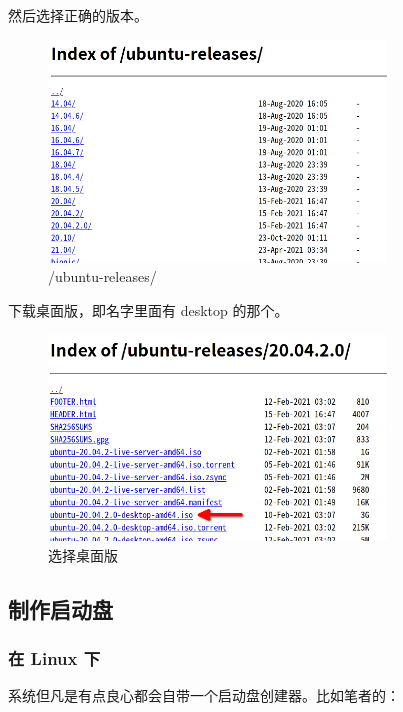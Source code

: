 \documentclass[UTF-8]{ctexart}
\begin{document}
				然后选择正确的版本。
				
				\begin{figure}[H]
					\centering
					\includegraphics[width=0.8\textwidth]{fig/mirrors163com_in_ubuntu-releases.png}
					\caption*{/ubuntu-releases/}
				\end{figure}
			
				下载桌面版，即名字里面有 desktop 的那个。
				
				\begin{figure}[H]
					\centering
					\includegraphics[width=0.8\textwidth]{fig/mirrors163com_choose_ubuntu-releases.png}
					\caption*{选择桌面版}
				\end{figure}
			
		\subsection{制作启动盘}
		
			\subsubsection{在 Linux 下}
			
				系统但凡是有点良心都会自带一个启动盘创建器。比如笔者的：
			
\end{document}
